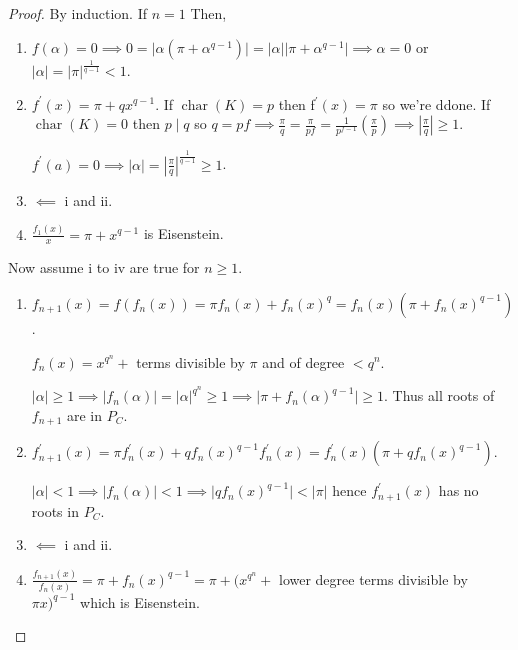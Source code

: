 \documentclass[openany]{amsbook}
\numberwithin{section}{chapter}
\theoremstyle{definition}
\begin{document}
\begin{proof}
    By induction. If \(n=1\) Then,

    \begin{enumerate}[label=\roman*)]
        \item \(f(\alpha) = 0 \implies 0 = \vert \alpha (\pi + \alpha^{q-1}) \vert = \vert \alpha \vert \vert \pi + \alpha ^ {q-1} \vert \implies \alpha = 0 \) or \(\vert \alpha  \vert = \vert \pi \vert ^{\frac{1}{q-1}} < 1\).
        \item \(f^{\prime} (x) = \pi + q x^{q-1}\). If \(\operatorname{char} (K) = p\) then f\(^{\prime} (x) = \pi\) so we're ddone. If \(\operatorname{char} (K) = 0\) then \(p \mid q\) so \(q = pf \implies \frac{\pi}{q} = \frac{\pi}{pf} = \frac{1}{p^{f-1}} \left( \frac{\pi}{p} \right) \implies \left\vert \frac{\pi}{q} \right\vert \geq 1\).
        
        \(f^{\prime} (a) = 0 \implies \vert \alpha  \vert = \left\vert \frac{\pi}{q} \right\vert ^{\frac{1}{q-1}} \geq 1\).
        
        \item \(\impliedby\) i and ii.
        \item \(\frac{f_1(x)}{x} = \pi + x^{q-1}\) is Eisenstein.
    \end{enumerate} 

    Now assume i to iv are true for \(n \geq 1\).

    \begin{enumerate}[label=\roman*)]
        \item \(f_{n+1} (x) = f(f_n(x)) = \pi f_n(x) + f_n(x)^q = f_n(x)(\pi + f_n(x)^{q-1})\).
        
        \(f_n(x) = x^{q^n} +\) terms divisible by \(\pi\) and of degree \(< q^n\).

        \(\vert \alpha \vert \geq 1 \implies \vert f_n(\alpha) \vert = \vert \alpha \vert ^{q^n } \geq 1 \implies \vert \pi + f_n(\alpha)^{q-1} \vert \geq 1\). Thus all roots of \(f_{n+1}\) are in \(P_C\).
        
        \item \(f_{n+1}^{\prime} (x) = \pi f_n ^{\prime} (x) + q f_n(x)^{q-1} f_n^{\prime} (x) = f_n^{\prime} (x) (\pi + q f_n(x)^{q-1})\).
        
        \(\vert \alpha \vert < 1 \implies \vert f_n(\alpha) \vert < 1 \implies \vert q f_n(x)^{q-1} \vert < \vert \pi \vert \) hence \(f_{n+1} ^{\prime} (x)\) has no roots in \(P_C\).

        \item \(\impliedby\) i and ii.
        \item \(\frac{f_{n+1}(x)}{f_n(x)} = \pi +  f_n(x)^{q-1} = \pi + (x^{q^n} +\) lower degree terms divisible by \(\pi x)^{q-1}\) which is Eisenstein. 

    \end{enumerate} 

\end{proof}
\end{document}
